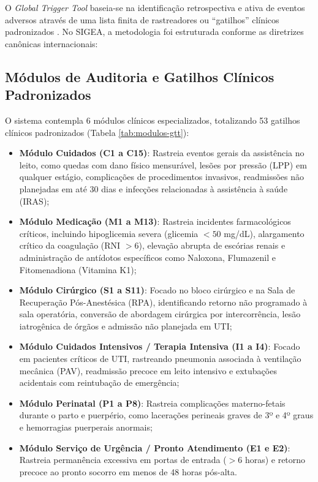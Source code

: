 O \textit{Global Trigger Tool} baseia-se na identificação retrospectiva e ativa de eventos adversos através de uma lista finita de rastreadores ou ``gatilhos'' clínicos padronizados \cite{griffin2019ihi, pierdevara2020}. No SIGEA, a metodologia foi estruturada conforme as diretrizes canônicas internacionais:

\subsection{Módulos de Auditoria e Gatilhos Clínicos Padronizados}
O sistema contempla 6 módulos clínicos especializados, totalizando 53 gatilhos clínicos padronizados (Tabela \ref{tab:modulos-gtt}):
\begin{itemize}
    \item \textbf{Módulo Cuidados (C1 a C15)}: Rastreia eventos gerais da assistência no leito, como quedas com dano físico mensurável, lesões por pressão (LPP) em qualquer estágio, complicações de procedimentos invasivos, readmissões não planejadas em até 30 dias e infecções relacionadas à assistência à saúde (IRAS);
    \item \textbf{Módulo Medicação (M1 a M13)}: Rastreia incidentes farmacológicos críticos, incluindo hipoglicemia severa (glicemia $< 50$ mg/dL), alargamento crítico da coagulação (RNI $> 6$), elevação abrupta de escórias renais e administração de antídotos específicos como Naloxona, Flumazenil e Fitomenadiona (Vitamina K1);
    \item \textbf{Módulo Cirúrgico (S1 a S11)}: Focado no bloco cirúrgico e na Sala de Recuperação Pós-Anestésica (RPA), identificando retorno não programado à sala operatória, conversão de abordagem cirúrgica por intercorrência, lesão iatrogênica de órgãos e admissão não planejada em UTI;
    \item \textbf{Módulo Cuidados Intensivos / Terapia Intensiva (I1 a I4)}: Focado em pacientes críticos de UTI, rastreando pneumonia associada à ventilação mecânica (PAV), readmissão precoce em leito intensivo e extubações acidentais com reintubação de emergência;
    \item \textbf{Módulo Perinatal (P1 a P8)}: Rastreia complicações materno-fetais durante o parto e puerpério, como lacerações perineais graves de 3º e 4º graus e hemorragias puerperais anormais;
    \item \textbf{Módulo Serviço de Urgência / Pronto Atendimento (E1 e E2)}: Rastreia permanência excessiva em portas de entrada ($> 6$ horas) e retorno precoce ao pronto socorro em menos de 48 horas pós-alta.
\end{itemize}

